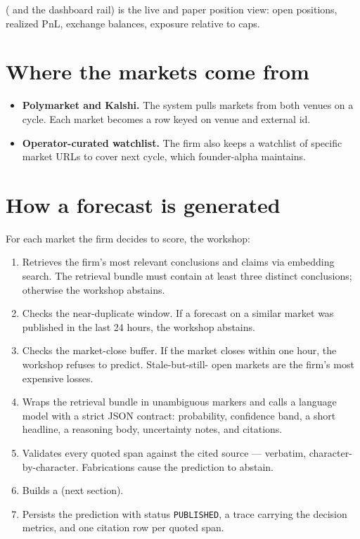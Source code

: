 \documentclass[11pt]{article}
\begin{document}
 ( and the dashboard rail)
is the live and paper position view: open positions, realized PnL,
exchange balances, exposure relative to caps.


\section{Where the markets come from}

\begin{itemize}[leftmargin=*,itemsep=0.2em]
  \item \textbf{Polymarket and Kalshi.} The system pulls markets from
        both venues on a cycle. Each market becomes a row keyed on
        venue and external id.
  \item \textbf{Operator-curated watchlist.} The firm also keeps a
        watchlist of specific market URLs to cover next cycle, which
        founder-alpha maintains.
\end{itemize}

\section{How a forecast is generated}

For each market the firm decides to score, the workshop:

\begin{enumerate}[leftmargin=*,itemsep=0.2em]
  \item Retrieves the firm's most relevant conclusions and claims via
        embedding search. The retrieval bundle must contain at least
        three distinct conclusions; otherwise the workshop abstains.
  \item Checks the near-duplicate window. If a forecast on a similar
        market was published in the last 24 hours, the workshop
        abstains.
  \item Checks the market-close buffer. If the market closes within
        one hour, the workshop refuses to predict. Stale-but-still-
        open markets are the firm's most expensive losses.
  \item Wraps the retrieval bundle in unambiguous markers and calls a
        language model with a strict JSON contract: probability,
        confidence band, a short headline, a reasoning body,
        uncertainty notes, and citations.
  \item Validates every quoted span against the cited source ---
        verbatim, character-by-character. Fabrications cause the
        prediction to abstain.
  \item Builds a  (next section).
  \item Persists the prediction with status \texttt{PUBLISHED}, a
        trace carrying the decision metrics, and one citation row per
        quoted span.
\end{enumerate}
\end{document}
